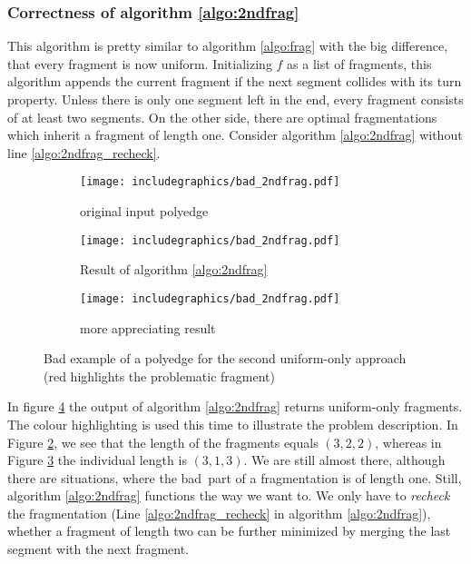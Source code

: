 \subsubsection{Correctness of algorithm \ref{algo:2ndfrag}}
This algorithm is pretty similar to algorithm \ref{algo:frag} with the big difference, that every fragment is now uniform. Initializing $f$ as a list of fragments, this algorithm appends the current fragment if the next segment collides with its turn property. Unless there is only one segment left in the end, every fragment consists of at least two segments. On the other side, there are optimal fragmentations which inherit a fragment of length one. Consider algorithm \ref{algo:2ndfrag} without line \ref{algo:2ndfrag_recheck}.
\begin{figure}[H]
	\centering
	\begin{subfigure}{0.3\textwidth}
		\centering
		\texttt{[image: includegraphics/bad\_2ndfrag.pdf]}
		\caption{original input polyedge}\label{im:bad_2ndfrag1}
	\end{subfigure}
	\begin{subfigure}{0.3\textwidth}
		\centering
		\texttt{[image: includegraphics/bad\_2ndfrag.pdf]}
		
		\caption{Result of algorithm \ref{algo:2ndfrag}}\label{im:bad_2ndfrag2}
	\end{subfigure}
	\begin{subfigure}{0.3\textwidth}
		\centering
		\texttt{[image: includegraphics/bad\_2ndfrag.pdf]}
		\caption{more appreciating result}\label{im:bad_2ndfrag3}
	\end{subfigure}
	\caption{Bad example of a polyedge for the second uniform-only approach (red highlights the problematic fragment)}
	\label{im:bad_2ndfrag}
\end{figure}
In figure \ref{im:bad_2ndfrag} the output of algorithm \ref{algo:2ndfrag} returns uniform-only fragments. The colour highlighting is used this time to illustrate the problem description. In Figure \ref{im:bad_2ndfrag2}, we see that the length of the fragments equals $(3,2,2)$, whereas in Figure \ref{im:bad_2ndfrag3} the individual length is $(3,1,3)$. We are still almost there, although there are situations, where the \grqq bad\grqq~part of a fragmentation is of length one. Still, algorithm \ref{algo:2ndfrag} functions the way we want to. We only have to \textit{recheck} the fragmentation (Line \ref{algo:2ndfrag_recheck} in algorithm \ref{algo:2ndfrag}), whether a fragment of length two can be further minimized by merging the last segment with the next fragment.\\
